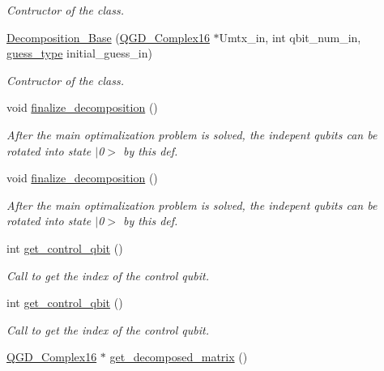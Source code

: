 \begin{DoxyCompactItemize}
\begin{DoxyCompactList}\small\item\em Contructor of the class. \end{DoxyCompactList}\item 
\hyperlink{class_decomposition___base_a1f3d192d35a7154ac02e2bb3de80cd45}{Decomposition\+\_\+\+Base} (\hyperlink{struct_q_g_d___complex16}{Q\+G\+D\+\_\+\+Complex16} $\ast$Umtx\+\_\+in, int qbit\+\_\+num\+\_\+in, \hyperlink{decomposition_2include_2_decomposition___base_8h_a0e76cf2e4eb5edbf067ba5014ffa2134}{guess\+\_\+type} initial\+\_\+guess\+\_\+in)
\begin{DoxyCompactList}\small\item\em Contructor of the class. \end{DoxyCompactList}\item 
void \hyperlink{class_decomposition___base_a0cdd12741e72e2c074a188fe3867e6d5}{finalize\+\_\+decomposition} ()
\begin{DoxyCompactList}\small\item\em After the main optimalization problem is solved, the indepent qubits can be rotated into state $\vert$0$>$ by this def. \end{DoxyCompactList}\item 
void \hyperlink{class_decomposition___base_a0cdd12741e72e2c074a188fe3867e6d5}{finalize\+\_\+decomposition} ()
\begin{DoxyCompactList}\small\item\em After the main optimalization problem is solved, the indepent qubits can be rotated into state $\vert$0$>$ by this def. \end{DoxyCompactList}\item 
int \hyperlink{class_operation_a2e9b60d334a0e0c99dede014ac989d0a}{get\+\_\+control\+\_\+qbit} ()
\begin{DoxyCompactList}\small\item\em Call to get the index of the control qubit. \end{DoxyCompactList}\item 
int \hyperlink{class_operation_a2e9b60d334a0e0c99dede014ac989d0a}{get\+\_\+control\+\_\+qbit} ()
\begin{DoxyCompactList}\small\item\em Call to get the index of the control qubit. \end{DoxyCompactList}\item 
\hyperlink{struct_q_g_d___complex16}{Q\+G\+D\+\_\+\+Complex16} $\ast$ \hyperlink{class_decomposition___base_ae71eaec68c77e79716cae632f97d42eb}{get\+\_\+decomposed\+\_\+matrix} ()

\end{DoxyCompactItemize}
